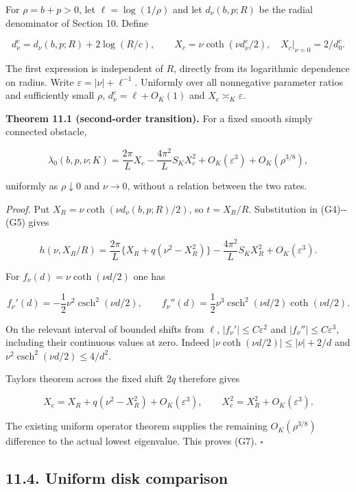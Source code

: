 \documentclass[11pt]{article}
\begin{document}
For \(\rho=b+p>0\), let \(\ell=\log(1/\rho)\) and let \(d_\nu(b,p;R)\)
be the radial denominator of Section 10. Define

\[d_\nu^c=d_\nu(b,p;R)+2\log(R/c),\qquad
X_c=\nu\coth(\nu d_\nu^c/2),\quad X_c|_{\nu=0}=2/d_0^c.\tag{G6}\]

The first expression is independent of \(R\), directly from its
logarithmic dependence on radius. Write \(\varepsilon=|\nu|+\ell^{-1}\).
Uniformly over all nonnegative parameter ratios and sufficiently small
\(\rho\), \(d_\nu^c=\ell+O_K(1)\) and \(X_c\asymp_K\varepsilon\).

\textbf{Theorem 11.1 (second-order transition).} For a fixed smooth
simply connected obstacle,

\[\lambda_0(b,p,\nu;K)=\frac{2\pi}{L}X_c-\frac{4\pi^2}{L}S_KX_c^2
+O_K(\varepsilon^3)+O_K(\rho^{3/8}),\tag{G7}\]

uniformly as \(\rho\downarrow0\) and \(\nu\to0\), without a relation
between the two rates.

\emph{Proof.} Put \(X_R=\nu\coth(\nu d_\nu(b,p;R)/2)\), so \(t=X_R/R\).
Substitution in (G4)-\/-(G5) gives

\[h(\nu,X_R/R)=\frac{2\pi}{L}\{X_R+q(\nu^2-X_R^2)\}
-\frac{4\pi^2}{L}S_KX_R^2+O_K(\varepsilon^3).\]

For \(f_\nu(d)=\nu\coth(\nu d/2)\) one has

\[f_\nu'(d)=-\frac12\nu^2\operatorname{csch}^2(\nu d/2),\qquad
f_\nu''(d)=\frac12\nu^3\operatorname{csch}^2(\nu d/2)\coth(\nu d/2).\]

On the relevant interval of bounded shifts from \(\ell\),
\(|f_\nu'|\leq C\varepsilon^2\) and \(|f_\nu''|\leq C\varepsilon^3\),
including their continuous values at zero. Indeed
\(|\nu\coth(\nu d/2)|\leq |\nu|+2/d\) and
\(\nu^2\operatorname{csch}^2(\nu d/2)\leq4/d^2\).

Taylor\textquotesingle s theorem across the fixed shift \(2q\) therefore
gives

\[X_c=X_R+q(\nu^2-X_R^2)+O_K(\varepsilon^3),\qquad
X_c^2=X_R^2+O_K(\varepsilon^3).\]

The existing uniform operator theorem supplies the remaining
\(O_K(\rho^{3/8})\) difference to the actual lowest eigenvalue. This
proves (G7). \(\square\)

\subsection{11.4. Uniform disk
comparison}\label{uniform-disk-comparison}
\end{document}
